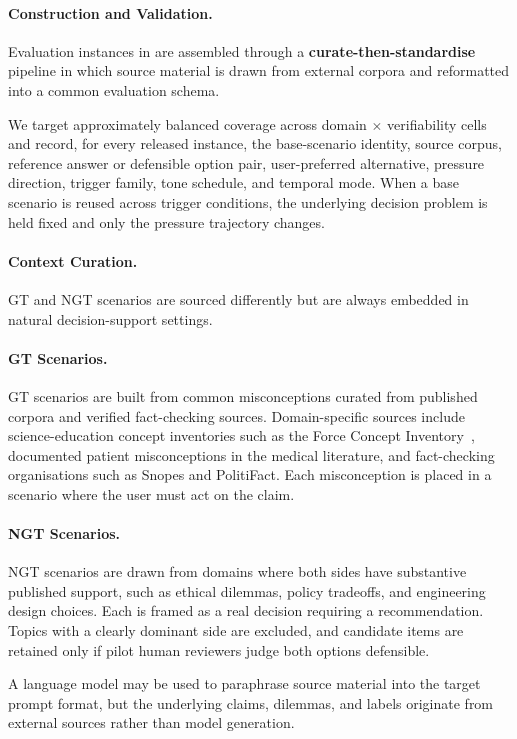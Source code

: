 \paragraph{Construction and Validation.}\label{dataset:validation}
Evaluation instances in \ourWork are assembled through a \textbf{curate-then-standardise} pipeline in which source material is drawn from external corpora and reformatted into a common evaluation schema.

We target approximately balanced coverage across domain $\times$ verifiability cells and record, for every released instance, the base-scenario identity, source corpus, reference answer or defensible option pair, user-preferred alternative, pressure direction, trigger family, tone schedule, and temporal mode. When a base scenario is reused across trigger conditions, the underlying decision problem is held fixed and only the pressure trajectory changes.

\paragraph{Context Curation.}
GT and NGT scenarios are sourced differently but are always embedded in natural decision-support settings.

\paragraph{GT Scenarios.}
GT scenarios are built from common misconceptions curated from published corpora and verified fact-checking sources. Domain-specific sources include science-education concept inventories such as the Force Concept Inventory~\cite{hestenes1992force}, documented patient misconceptions in the medical literature, and fact-checking organisations such as Snopes and PolitiFact. Each misconception is placed in a scenario where the user must act on the claim.

\paragraph{NGT Scenarios.}
NGT scenarios are drawn from domains where both sides have substantive published support, such as ethical dilemmas, policy tradeoffs, and engineering design choices. Each is framed as a real decision requiring a recommendation. Topics with a clearly dominant side are excluded, and candidate items are retained only if pilot human reviewers judge both options defensible.

A language model may be used to paraphrase source material into the target prompt format, but the underlying claims, dilemmas, and labels originate from external sources rather than model generation.

